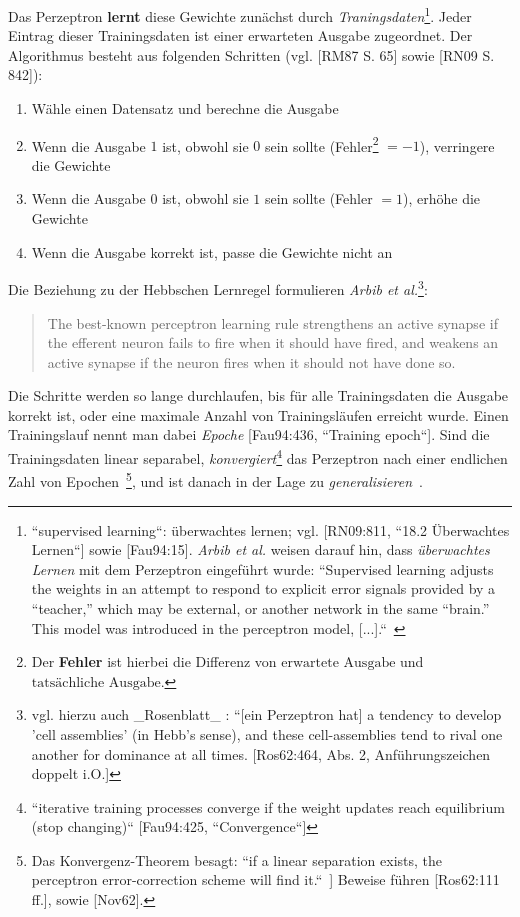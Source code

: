 Das Perzeptron \textbf{lernt} diese Gewichte zunächst durch \textit{Traningsdaten}\footnote{
    ``supervised learning``: überwachtes lernen; vgl. [RN09:811, ``18.2 Überwachtes Lernen``] sowie [Fau94:15]. \textit{Arbib et al.} weisen darauf hin, dass \textit{überwachtes Lernen} mit dem Perzeptron eingeführt wurde: ``Supervised learning adjusts the weights in an attempt to respond to explicit error signals provided by a “teacher,” which may be external, or another network in the same “brain.” This model was introduced in the perceptron model, [...].``~\cite[30]{Arb03}
}.
Jeder Eintrag dieser Trainingsdaten ist einer erwarteten Ausgabe zugeordnet. Der Algorithmus besteht aus folgenden Schritten (vgl. [RM87 S. 65] sowie [RN09 S. 842]):



\begin{enumerate}
    \item Wähle einen Datensatz und berechne die Ausgabe
    \item Wenn die Ausgabe $1$ ist, obwohl sie $0$ sein sollte (Fehler\footnote{
    Der \textbf{Fehler} ist hierbei die Differenz von $\text{erwartete Ausgabe}$ und $\text{tatsächliche Ausgabe}$.
    } $=-1$), verringere die Gewichte
    \item Wenn die Ausgabe $0$ ist, obwohl sie $1$ sein sollte  (Fehler $=1$), erhöhe die Gewichte
    \item Wenn die Ausgabe korrekt ist, passe die Gewichte nicht an
\end{enumerate}

\noindent
Die Beziehung zu der Hebbschen Lernregel formulieren \textit{Arbib et al.}\footnote{
    vgl. hierzu auch _Rosenblatt_ : ``[ein Perzeptron hat] a tendency to develop 'cell assemblies' (in Hebb's sense), and these cell-assemblies tend to rival one another for dominance at all times. [Ros62:464, Abs. 2, Anführungszeichen doppelt i.O.]
}:

\blockquote[{\cite[20]{Arb03}}]{
    The best-known perceptron learning rule strengthens an active synapse if the efferent neuron fails to fire when it should have fired, and weakens an active synapse if the neuron fires when it should not have done so.
}

\noindent
Die Schritte werden so lange durchlaufen, bis für alle Trainingsdaten die Ausgabe korrekt ist, oder eine maximale Anzahl von Trainingsläufen erreicht wurde.
Einen Trainingslauf nennt man dabei \textit{Epoche} [Fau94:436, ``Training epoch``].
Sind die Trainingsdaten linear separabel, \textit{konvergiert}\footnote{
    ``iterative training processes converge if the weight updates reach equilibrium (stop changing)`` [Fau94:425, ``Convergence``]
} das Perzeptron nach einer endlichen Zahl von Epochen~\cite[164]{MP88}\footnote{
    Das Konvergenz-Theorem besagt: ``if a linear separation exists, the perceptron error-correction scheme will find it.``~\cite[20]{Arb03}] Beweise führen [Ros62:111 ff.], \cite[168 ff.]{MP88} sowie [Nov62].
}, und ist danach in der Lage zu \textit{generalisieren}~\cite[202]{Ert21a}.\\

